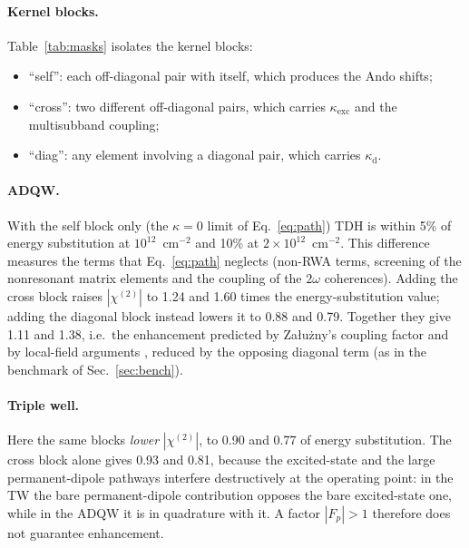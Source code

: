 \documentclass[11pt]{article}
\newcommand{\chitwo}{\chi^{(2)}}
\begin{document}
\paragraph{Kernel blocks.} Table~\ref{tab:masks} isolates the kernel blocks:
\begin{itemize}
\item ``self'': each off-diagonal pair with itself, which produces the Ando shifts;
\item ``cross'': two different off-diagonal pairs, which carries $\kappa_\mathrm{exc}$ and the multisubband coupling;
\item ``diag'': any element involving a diagonal pair, which carries $\kappa_\mathrm{d}$.
\end{itemize}

\paragraph{ADQW.} With the self block only (the $\kappa=0$ limit of Eq.~\eqref{eq:path}) TDH is within 5\% of energy substitution at $10^{12}$~cm$^{-2}$ and 10\% at $2\times10^{12}$~cm$^{-2}$. This difference measures the terms that Eq.~\eqref{eq:path} neglects (non-RWA terms, screening of the nonresonant matrix elements and the coupling of the $2\omega$ coherences). Adding the cross block raises $|\chitwo|$ to 1.24 and 1.60 times the energy-substitution value; adding the diagonal block instead lowers it to 0.88 and 0.79. Together they give 1.11 and 1.38, i.e.\ the enhancement predicted by Załużny's coupling factor \cite{Zaluzny1995} and by local-field arguments \cite{Krieguer2024}, reduced by the opposing diagonal term (as in the benchmark of Sec.~\ref{sec:bench}).

\paragraph{Triple well.} Here the same blocks \emph{lower} $|\chitwo|$, to 0.90 and 0.77 of energy substitution. The cross block alone gives 0.93 and 0.81, because the excited-state and the large permanent-dipole pathways interfere destructively at the operating point: in the TW the bare permanent-dipole contribution opposes the bare excited-state one, while in the ADQW it is in quadrature with it. A factor $|F_p|>1$ therefore does not guarantee enhancement.
\end{document}
